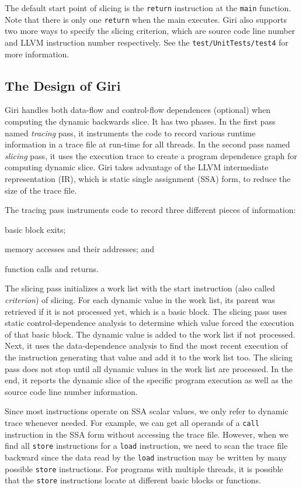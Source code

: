 \documentclass[DIV=calc, paper=a4, fontsize=11pt, twocolumn]{scrartcl}
\begin{document}
The default start point of slicing is the \texttt{return} instruction at the \texttt{main} function.
Note that there is only one \texttt{return} when the main executes.
Giri also supports two more ways to specify the slicing criterion, which are source code line number and LLVM instruction number respectively.
See the \texttt{test/UnitTests/test4} for more information.

\subsection{The Design of Giri}
Giri handles both data-flow and control-flow dependences (optional) when computing the dynamic backwards slice. 
It has two phases.
In the first pass named \emph{tracing} pass, it instruments the code to record various runtime information in a trace file at run-time for all threads.
In the second pass named \emph{slicing} pass, it uses the execution trace to create a program dependence graph for computing dynamic slice.
Giri takes advantage of the LLVM intermediate representation (IR), which is static single assignment (SSA) form, to reduce the size of the trace file. 

The tracing pass instruments code to record three different pieces of information:
\begin{inparaenum}[\itshape 1\upshape)]
	\item basic block exits;
	\item memory accesses and their addresses; and
	\item function calls and returns.
\end{inparaenum}
The slicing pass initializes a work list with the start instruction (also called \emph{criterion}) of slicing.
For each dynamic value in the work list,
its parent was retrieved if it is not processed yet, which is a basic block. 
The slicing pass uses static control-dependence analysis to determine which value forced the execution of that basic block.
The dynamic value is added to the work list if not processed.
Next, it uses the data-dependence analysis to find the most recent execution of the instruction generating that value and add it to the work list too.
The slicing pass does not stop until all dynamic values in the work list are processed.
In the end, it reports the dynamic slice of the specific program execution as well as the source code line number information.

Since most instructions operate on SSA scalar values, we only refer to dynamic trace whenever needed.
For example, we can get all operands of a \texttt{call} instruction in the SSA form without accessing the trace file.
However, when we find all \texttt{store} instructions for a \texttt{load} instruction,
we need to scan the trace file backward since the data read by the \texttt{load} instruction may be written by many possible \texttt{store} instructions.
For programs with multiple threads, it is possible that the \texttt{store} instructions locate at different basic blocks or functions.
\end{document}
